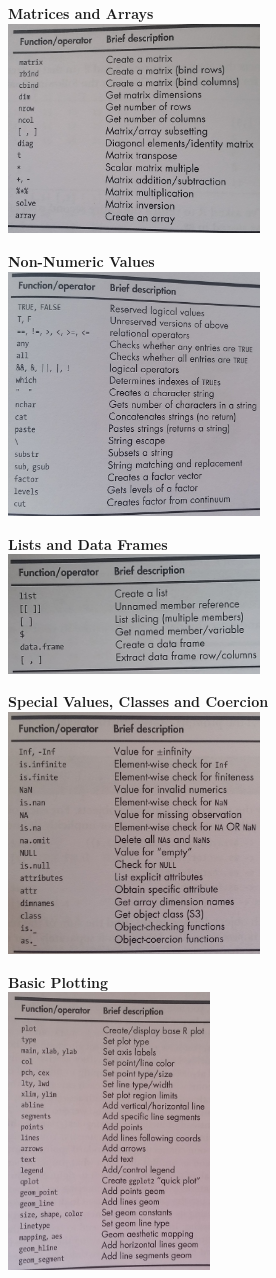 \documentclass[a4paper,landscape]{slides}
\begin{document}
{\bfseries Matrices and Arrays\\}
\includegraphics[width=0.5\textwidth]{ch3.jpg}
\newpage

{\bfseries Non-Numeric Values\\}
\includegraphics[width=0.5\textwidth]{ch4.jpg}
\newpage

{\bfseries Lists and Data Frames\\}
\includegraphics[width=0.5\textwidth]{ch5.jpg}
\newpage

{\bfseries Special Values, Classes and Coercion \\}
\includegraphics[width=0.5\textwidth]{ch6.jpg}
\newpage

{\bfseries Basic Plotting\\}
\includegraphics[width=0.4\textwidth]{ch7.jpg}
\newpage
\end{document}
